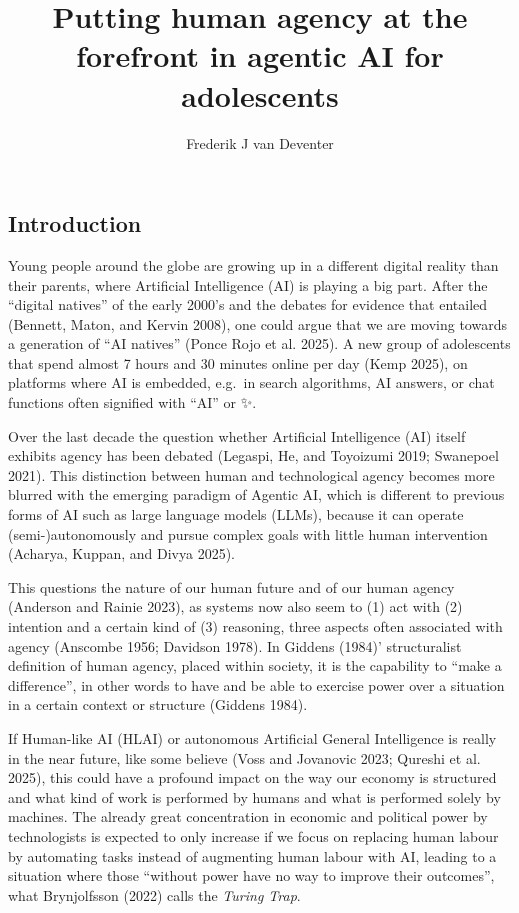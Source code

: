 \documentclass[
  letterpaper,
  DIV=11,
  numbers=noendperiod]{scrartcl}
\title{Putting human agency at the forefront in agentic AI for
adolescents}
\author{Frederik J van Deventer}
\date{}
\begin{document}
\maketitle


\subsection{Introduction}\label{introduction}

Young people around the globe are growing up in a different digital
reality than their parents, where Artificial Intelligence (AI) is
playing a big part. After the ``digital natives'' of the early 2000's
and the debates for evidence that entailed (Bennett, Maton, and Kervin
2008), one could argue that we are moving towards a generation of ``AI
natives'' (Ponce Rojo et al. 2025). A new group of adolescents that
spend almost 7 hours and 30 minutes online per day (Kemp 2025), on
platforms where AI is embedded, e.g.~in search algorithms, AI answers,
or chat functions often signified with ``AI'' or ✨.

Over the last decade the question whether Artificial Intelligence (AI)
itself exhibits agency has been debated (Legaspi, He, and Toyoizumi
2019; Swanepoel 2021). This distinction between human and technological
agency becomes more blurred with the emerging paradigm of Agentic AI,
which is different to previous forms of AI such as large language models
(LLMs), because it can operate (semi-)autonomously and pursue complex
goals with little human intervention (Acharya, Kuppan, and Divya 2025).

This questions the nature of our human future and of our human agency
(Anderson and Rainie 2023), as systems now also seem to (1) act with (2)
intention and a certain kind of (3) reasoning, three aspects often
associated with agency (Anscombe 1956; Davidson 1978). In Giddens
(1984)' structuralist definition of human agency, placed within society,
it is the capability to ``make a difference'', in other words to have
and be able to exercise power over a situation in a certain context or
structure (Giddens 1984).

If Human-like AI (HLAI) or autonomous Artificial General Intelligence is
really in the near future, like some believe (Voss and Jovanovic 2023;
Qureshi et al. 2025), this could have a profound impact on the way our
economy is structured and what kind of work is performed by humans and
what is performed solely by machines. The already great concentration in
economic and political power by technologists is expected to only
increase if we focus on replacing human labour by automating tasks
instead of augmenting human labour with AI, leading to a situation where
those ``without power have no way to improve their outcomes'', what
Brynjolfsson (2022) calls the \emph{Turing Trap}.
\end{document}
